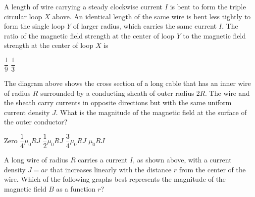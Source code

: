 \documentclass[12pt]{../oss-classkick-exam}
\begin{document}
\begin{questions}

  \question A length of wire carrying a steady clockwise current $I$ is bent
  to form the triple circular loop $X$ above. An identical length of the same
  wire is bent less tightly to form the single loop $Y$ of larger radius, which
  carries the same current $I$. The ratio of the magnetic field strength at the
  center of loop $Y$ to the magnetic field strength at the center of loop $X$ is

  \begin{oneparchoices}
    \choice $\dfrac19$\hspace{.4in}
    \choice $\dfrac13$\hspace{.4in}
    \hspace{.4in}
    \hspace{.4in}
  \end{oneparchoices}

  \question The diagram above shows the cross section of a long cable that has
  an inner wire of radius $R$ surrounded by a conducting sheath of outer radius
  $2R$. The wire and the sheath carry currents in opposite directions but with
  the same uniform current density $J$. What is the magnitude of the magnetic
  field at the surface of the outer conductor?
  \begin{choices}
    \choice Zero
    \choice $\dfrac14\mu_0RJ$
    \choice $\dfrac12\mu_0RJ$
    \choice $\dfrac34\mu_0RJ$
    \choice $\mu_0RJ$
  \end{choices}
  \newpage

  \question\vspace{-.15in} A long wire of radius $R$ carries a current $I$, as
  shown above, with a current density $J=ar$ that increases linearly with the
  distance $r$ from the center of the wire. Which of the following graphs best
  represents the magnitude of the magnetic field $B$ as a function $r$?


\end{questions}
\end{document}
